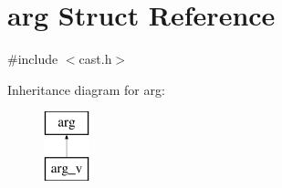 \hypertarget{structarg}{}\section{arg Struct Reference}
\label{structarg}


{\ttfamily \#include $<$cast.\+h$>$}

Inheritance diagram for arg\+:\begin{figure}[H]
\begin{center}
\leavevmode
\includegraphics[height=2.000000cm]{structarg}
\end{center}
\end{figure}
